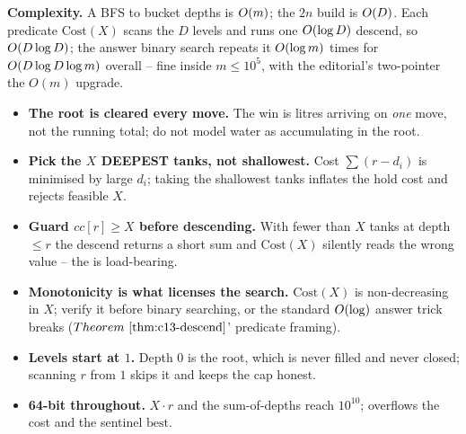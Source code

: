 \noindent\textbf{Complexity.} A BFS to bucket depths is \(O(m)\); the \(2n\) build is
\(O(D)\). Each predicate \(\text{Cost}(X)\) scans the \(D\) levels and runs one
\(O(\log D)\) descend, so \(O(D\log D)\); the answer binary search repeats it
\(O(\log m)\) times for \(O(D\log D\log m)\) overall -- fine inside \(m\le10^5\),
with the editorial's two-pointer the \(O(m)\) upgrade.

\begin{hardeningbox}
\begin{itemize}[nosep,leftmargin=1.4em]
  \item \textbf{The root is cleared every move.} The win is litres arriving on \emph{one}
        move, not the running total; do not model water as accumulating in the root.
  \item \textbf{Pick the \(X\) DEEPEST tanks, not shallowest.} Cost \(\sum(r-d_i)\) is
        minimised by large \(d_i\); taking the shallowest tanks inflates the hold cost
        and rejects feasible \(X\).
  \item \textbf{Guard \(\mathit{cc}[r]\ge X\) before descending.} With fewer than \(X\)
        tanks at depth \(\le r\) the descend returns a short sum and \(\text{Cost}(X)\)
        silently reads the wrong value -- the  is load-bearing.
  \item \textbf{Monotonicity is what licenses the search.} \(\text{Cost}(X)\) is
        non-decreasing in \(X\); verify it before binary searching, or the standard
        \(O(\log)\) answer trick breaks (\(\thmref{c13-descend}\)' predicate framing).
  \item \textbf{Levels start at \(1\).} Depth \(0\) is the root, which is never filled and
        never closed; scanning \(r\) from \(1\) skips it and keeps the cap honest.
  \item \textbf{64-bit throughout.} \(X\cdot r\) and the sum-of-depths reach
        \(10^{10}\);  overflows the cost and the sentinel \(\text{best}\).
\end{itemize}
\end{hardeningbox}

